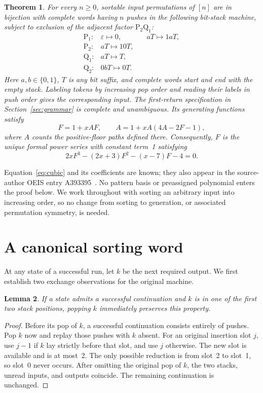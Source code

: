 \documentclass[11pt,a4paper]{article}
\newtheorem{theorem}{Theorem}
\newtheorem{lemma}[theorem]{Lemma}
\theoremstyle{remark}
\newcommand{\eps}{\varepsilon}
\newcommand{\PP}{\mathrm{P}}
\newcommand{\QQ}{\mathrm{Q}}
\begin{document}
\begin{theorem}\label{thm:main}
For every $n\geq0$, sortable input permutations of $[n]$ are in bijection
with complete words having $n$ pushes in the following bit-stack machine,
subject to exclusion of the adjacent factor $\PP_2\QQ_1$:
\begin{equation}\label{eq:bits}
\begin{array}{rcll}
 \PP_1:&\eps\longmapsto0,&\quad aT\longmapsto1aT,\\
 \PP_2:&aT\longmapsto10T,\\
 \QQ_1:&aT\longmapsto T,\\
 \QQ_2:&0bT\longmapsto0T.
\end{array}
\end{equation}
Here $a,b\in\{0,1\}$, $T$ is any bit suffix, and complete words start and
end with the empty stack. Labeling tokens by increasing pop order and
reading their labels in push order gives the corresponding input.
The first-return specification in Section~\ref{sec:grammar} is complete
and unambiguous. Its generating functions satisfy
\begin{equation}\label{eq:reduced}
 F=1+xAF,\qquad A=1+xA(4A-2F-1),
\end{equation}
where $A$ counts the positive-floor paths defined there. Consequently,
$F$ is the unique formal power series with constant term~1 satisfying
\begin{equation}\label{eq:cubic}
 2xF^3-(2x+3)F^2-(x-7)F-4=0.
\end{equation}
\end{theorem}

Equation~\eqref{eq:cubic} and its coefficients are known; they also appear
in the source-author OEIS entry A393395~\cite{OEIS393395}. No pattern basis
or preassigned polynomial enters the proof below. We work throughout
with sorting an arbitrary input into increasing order, so no change from
sorting to generation, or associated permutation symmetry, is needed.

\section{A canonical sorting word}

At any state of a successful run, let $k$ be the next required output.
We first establish two exchange observations for the original machine.

\begin{lemma}\label{lem:eager}
If a state admits a successful continuation and $k$ is in one of the
first two stack positions, popping $k$ immediately preserves this property.
\end{lemma}
\begin{proof}
Before its pop of $k$, a successful continuation consists entirely of
pushes. Pop $k$ now and replay those pushes with $k$ absent. For an original
insertion slot $j$, use $j-1$ if $k$ lay strictly before that slot, and
use $j$ otherwise. The new slot is available and is at most~2. The only
possible reduction is from slot~2 to slot~1, so slot~0 never occurs.
After omitting the original pop of $k$, the two stacks, unread inputs,
and outputs coincide. The remaining continuation is unchanged.
\end{proof}
\end{document}
